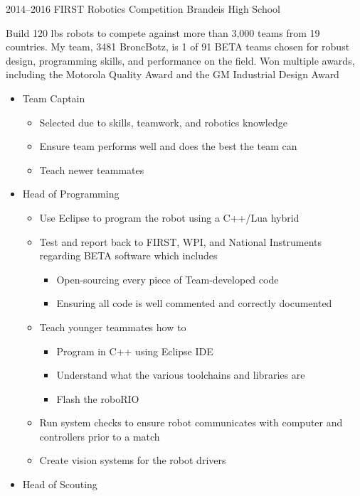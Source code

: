 \documentclass[]{friggeri-cv} %
\begin{document}
\begin{entrylist}

	\entry
	{2014--2016}
	{FIRST Robotics Competition}
	{Brandeis High School}
	{Build 120 lbs robots to compete against more than 3,000 teams from 19 countries. My team, 3481 BroncBotz, is 1 of 91 BETA teams chosen for robust design, programming skills, and performance on the field. Won multiple awards, including the Motorola Quality Award and the GM Industrial Design Award
		\begin{itemize}
			\item Team Captain
				\begin{itemize}
					\item Selected due to skills, teamwork, and robotics knowledge
					\item Ensure team performs well and does the best the team can
					\item Teach newer teammates
				\end{itemize}
			\item Head of Programming
				\begin{itemize}
					\item Use Eclipse to program the robot using a C++/Lua hybrid
					\item Test and report back to FIRST, WPI, and National Instruments regarding BETA software which includes
						\begin{itemize}
							\item Open-sourcing every piece of Team-developed code
							\item Ensuring all code is well commented and correctly documented
						\end{itemize}
					\item Teach younger teammates how to
						\begin{itemize}
							\item Program in C++ using Eclipse IDE
							\item Understand what the various toolchains and libraries are
							\item Flash the roboRIO
						\end{itemize}
					\item Run system checks to ensure robot communicates with computer and controllers prior to a match
					\item Create vision systems for the robot drivers
				\end{itemize}
			\item Head of Scouting
				\begin{itemize}

\end{itemize}
\end{itemize}}
\end{entrylist}
\end{document}
